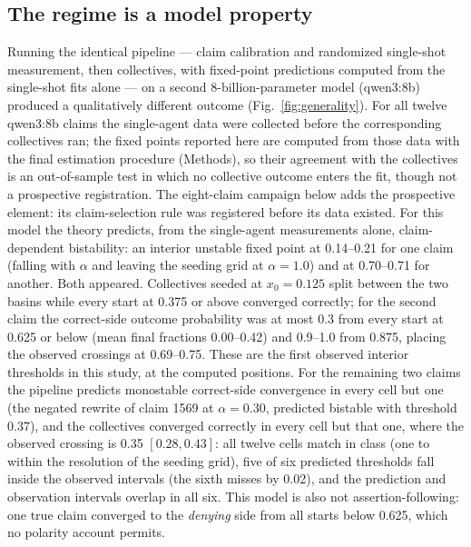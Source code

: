 \documentclass[9pt,twocolumn]{extarticle}
\begin{document}
\subsection{The regime is a model property}\label{sec:generality}

Running the identical pipeline --- claim calibration and randomized
single-shot measurement, then collectives, with fixed-point predictions
computed from the single-shot fits alone --- on a second 8-billion-parameter
model (qwen3:8b) produced a
qualitatively different outcome (Fig.~\ref{fig:generality}). For all twelve
qwen3:8b claims the single-agent data were collected before the
corresponding collectives ran; the fixed points reported here are computed
from those data with the final estimation procedure (Methods), so their
agreement with the collectives is an out-of-sample test in which no
collective outcome enters the fit, though not a prospective registration.
The eight-claim campaign below adds the prospective element: its
claim-selection rule was registered before its data existed. For
this model the theory predicts, from the single-agent measurements alone,
claim-dependent bistability: an interior unstable fixed point at 0.14--0.21
for one claim (falling with $\alpha$ and leaving the seeding grid at
$\alpha = 1.0$) and at 0.70--0.71 for another. Both appeared. Collectives
seeded at $x_0 = 0.125$ split between the two basins while every start at
0.375 or above converged correctly; for the second claim the correct-side
outcome probability was at most 0.3 from every start at 0.625 or below (mean
final fractions 0.00--0.42) and 0.9--1.0 from 0.875, placing the observed
crossings at 0.69--0.75. These are the first observed
interior thresholds in this study, at the computed positions. For the
remaining two claims the pipeline predicts monostable correct-side
convergence in every cell but one (the negated rewrite of claim 1569 at
$\alpha = 0.30$, predicted bistable with threshold 0.37), and the collectives
converged correctly in every cell but that one, where the observed crossing
is 0.35 $[0.28, 0.43]$: all twelve cells match in class (one to within the
resolution of the seeding grid), five of six predicted thresholds fall inside
the observed intervals (the sixth misses by 0.02), and the prediction and
observation intervals overlap in all six. This model is also not
assertion-following: one true claim converged to the \emph{denying} side from
all starts below 0.625, which no polarity account permits.
\end{document}
